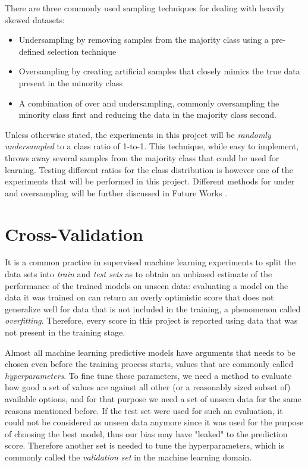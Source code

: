 \documentclass{kththesis}
\begin{document}
There are three commonly used sampling techniques for dealing with heavily skewed datasets: 

\begin{itemize}
\item Undersampling by removing samples from the majority class using a pre-defined selection technique
\item Oversampling by creating artificial samples that closely mimics the true data present in the minority class
\item A combination of over and undersampling, commonly oversampling the minority class first and reducing the data in the majority class second.
\end{itemize}

Unless otherwise stated, the experiments in this project will be \emph{randomly undersampled} to a class ratio of 1-to-1. This technique, while easy to implement, throws away several samples from the majority class that could be used for learning. Testing different ratios for the class distribution is however one of the experiments that will be performed in this project. Different methods for under and oversampling will be further discussed in Future Works .

\section{Cross-Validation}

It is a common  practice in supervised machine learning experiments to split the data sets into \emph{train} and \emph{test sets} as to obtain an unbiased estimate of the performance of the trained models on unseen data: evaluating a model on the data it was trained on can return an overly optimistic score that does not generalize well for data that is not included in the training, a phenomenon called \emph{overfitting}. Therefore, every score in this project is reported using data that was not present in the training stage.

Almost all machine learning predictive models have arguments that needs to be chosen even before the training process starts, values that are commonly called \emph{hyperparameters}. To fine tune these parameters, we need a method to evaluate how good a set of values are against all other (or a reasonably sized subset of) available options, and for that purpose we need a set of unseen data for the same reasons mentioned before. If the test set were used for such an evaluation, it could not be considered as unseen data anymore since it was used for the purpose of choosing the best model, thus our bias may have "leaked" to the prediction score. Therefore another set is needed to tune the hyperparameters, which is commonly called the \emph{validation set} in the machine learning domain.
\end{document}
